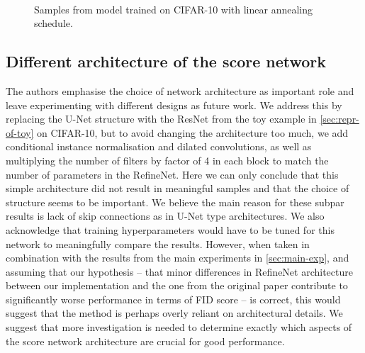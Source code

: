 \begin{figure}[h!]
    \centering
    \hspace{1mm}
    \hspace{1mm}
    \\
    \hspace{1mm}
     \caption{Samples from model trained on CIFAR-10 with linear annealing schedule.}
     \label{fig:linear}
\end{figure}

\subsection{Different architecture of the score network}
The authors emphasise the choice of network architecture as important role and leave experimenting with different designs as future work. We address this by replacing the U-Net structure with the ResNet from the toy example in \autoref{sec:repr-of-toy} on CIFAR-10, but to avoid changing the architecture too much, we add conditional instance normalisation and dilated convolutions, as well as multiplying the number of filters by factor of 4 in each block to match the number of parameters in the RefineNet. Here we can only conclude that this simple architecture did not result in meaningful samples and that the choice of structure seems to be important. We believe the main reason for these subpar results is lack of skip connections as in U-Net type architectures. We also acknowledge that training hyperparameters would have to be tuned for this network to meaningfully compare the results. However, when taken in combination with the results from the main experiments in \autoref{sec:main-exp}, and assuming that our hypothesis -- that minor differences in RefineNet architecture between our implementation and the one from the original paper contribute to significantly worse performance in terms of FID score -- is correct, this would suggest that the method is perhaps overly reliant on architectural details. We suggest that more investigation is needed to determine exactly which aspects of the score network architecture are crucial for good performance.


